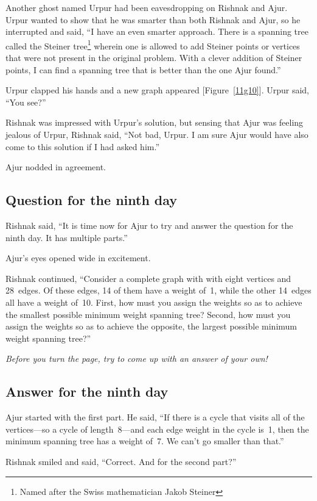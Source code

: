 Another ghost named Urpur had been eavesdropping on Rishnak and Ajur. Urpur wanted to show that he was smarter than both Rishnak and Ajur, so he interrupted and said, ``I have an even smarter approach. There is a spanning tree called the Steiner tree\footnote{Named after the Swiss mathematician Jakob Steiner} wherein one is allowed to add Steiner points or vertices that were not present in the original problem. With a clever addition of Steiner points, I can find a spanning tree that is better than the one Ajur found.'' 

Urpur clapped his hands and a new graph appeared [Figure~\ref{11g10}]. Urpur said, ``You see?''

Rishnak was impressed with Urpur's solution, but sensing that Ajur was feeling jealous of Urpur, Rishnak said, ``Not bad, Urpur. I am sure Ajur would have also come to this solution if I had asked him.''

Ajur nodded in agreement.

\subsection*{Question for the ninth day}
Rishnak said, ``It is time now for Ajur to try and answer the question for the ninth day. It has multiple parts.''

Ajur's eyes opened wide in excitement.

Rishnak continued, ``Consider a complete graph with with eight vertices and 28~edges. Of these edges, 14 of them have a weight of~1, while the other 14~edges all have a weight of~10. First, how must you assign the weights so as to achieve the smallest possible minimum weight spanning tree? Second, how must you assign the weights so as to achieve the opposite, the largest possible minimum weight spanning tree?''

\textit{Before you turn the page, try to come up with an answer of your own!}

\newpage
\subsection*{Answer for the ninth day}
Ajur started with the first part. He said, ``If there is a cycle that visits all of the vertices---so a cycle of length~8---and each edge weight in the cycle is~1, then the minimum spanning tree has a weight of~7. We can't go smaller than that.''

Rishnak smiled and said, ``Correct. And for the second part?''

